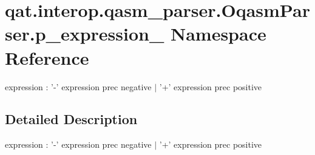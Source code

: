 \hypertarget{namespaceqat_1_1interop_1_1qasm__parser_1_1OqasmParser_1_1p__expression__1}{\section{qat.\-interop.\-qasm\-\_\-parser.\-Oqasm\-Parser.\-p\-\_\-expression\-\_ Namespace Reference}
\label{namespaceqat_1_1interop_1_1qasm__parser_1_1OqasmParser_1_1p__expression__1}
}


expression \-: '-\/' expression prec negative $|$ '+' expression prec positive  




\subsection{Detailed Description}
expression \-: '-\/' expression prec negative $|$ '+' expression prec positive 